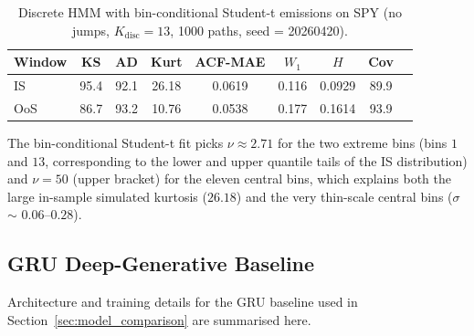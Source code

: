 \begin{table}[h]
\centering
\small
\caption{Discrete HMM with bin-conditional Student-t emissions on SPY (no jumps, $K_{\text{disc}} = 13$, 1000 paths, seed = 20260420).}
\label{tab:bin_t}
\begin{tabular}{l cc cc c c c c}
\toprule
Window & KS & AD & Kurt & ACF-MAE & $W_1$ & $H$ & Cov \\
\midrule
IS  & 95.4 & 92.1 & 26.18 & 0.0619 & 0.116 & 0.0929 & 89.9 \\
OoS & 86.7 & 93.2 & 10.76 & 0.0538 & 0.177 & 0.1614 & 93.9 \\
\bottomrule
\end{tabular}
\end{table}

The bin-conditional Student-t fit picks $\nu \approx 2.71$ for the two extreme bins (bins $1$ and $13$, corresponding to the lower and upper quantile tails of the IS distribution) and $\nu = 50$ (upper bracket) for the eleven central bins, which explains both the large in-sample simulated kurtosis ($26.18$) and the very thin-scale central bins ($\sigma$ $\sim$ $0.06$--$0.28$).



\subsection{GRU Deep-Generative Baseline}
\label{sec:gru_supp}

Architecture and training details for the GRU baseline used in
Section~\ref{sec:model_comparison} are summarised here.

